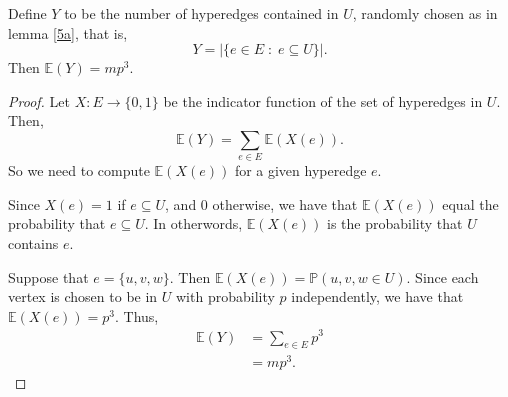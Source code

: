 \documentclass{unswmaths}
\begin{document}
\begin{lemma}[Part (b)]
\label{5b}
    Define $Y$ to be the number of hyperedges contained in $U$, randomly
    chosen as in lemma \ref{5a}, that is,
    \begin{equation}
        Y = |\{e \in E\;:\;e \subseteq U\}|.
    \end{equation}
    Then $\mathbb{E}(Y) = mp^3$.
\end{lemma}
\begin{proof}
    Let $X:E\to \{0,1\}$ be the indicator function
    of the set of hyperedges in $U$.
    Then,
    \begin{equation*}
        \mathbb{E}(Y) = \sum_{e \in E} \mathbb{E}(X(e)).
    \end{equation*}
    So we need to compute $\mathbb{E}(X(e))$ for a given
    hyperedge $e$. 
    
    Since $X(e) = 1$ if $e \subseteq U$, and $0$ otherwise,
    we have that $\mathbb{E}(X(e))$ equal the probability
    that $e \subseteq U$. In otherwords, $\mathbb{E}(X(e))$
    is the probability that $U$ contains $e$. 
     
    Suppose that $e = \{u,v,w\}$. Then $\mathbb{E}(X(e)) = \mathbb{P}(u,v,w \in U)$. 
    Since each vertex is chosen to be in $U$ with probability $p$ independently,
    we have that $\mathbb{E}(X(e)) = p^3$. 
    Thus,
    \begin{align*}
        \mathbb{E}(Y) &= \sum_{e \in E} p^3\\
                      &= mp^3.
    \end{align*}
\end{proof}
\end{document}

